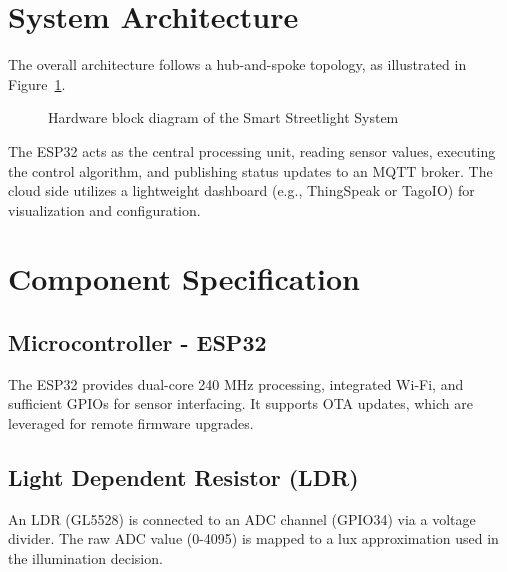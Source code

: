 \documentclass[12pt, a4paper]{article}
\begin{document}
\section{System Architecture}
The overall architecture follows a hub-and-spoke topology, as illustrated in Figure~\ref{fig:architecture}.

\begin{figure}[H]
  \centering
  \caption{Hardware block diagram of the Smart Streetlight System}
  \label{fig:architecture}
\end{figure}

The ESP32 acts as the central processing unit, reading sensor values, executing the control algorithm, and publishing status updates to an MQTT broker. The cloud side utilizes a lightweight dashboard (e.g., ThingSpeak or TagoIO) for visualization and configuration.

\section{Component Specification}
\subsection{Microcontroller - ESP32}
The ESP32 provides dual-core 240 MHz processing, integrated Wi-Fi, and sufficient GPIOs for sensor interfacing. It supports OTA updates, which are leveraged for remote firmware upgrades.

\subsection{Light Dependent Resistor (LDR)}
An LDR (GL5528) is connected to an ADC channel (GPIO34) via a voltage divider. The raw ADC value (0-4095) is mapped to a lux approximation used in the illumination decision.
\end{document}

